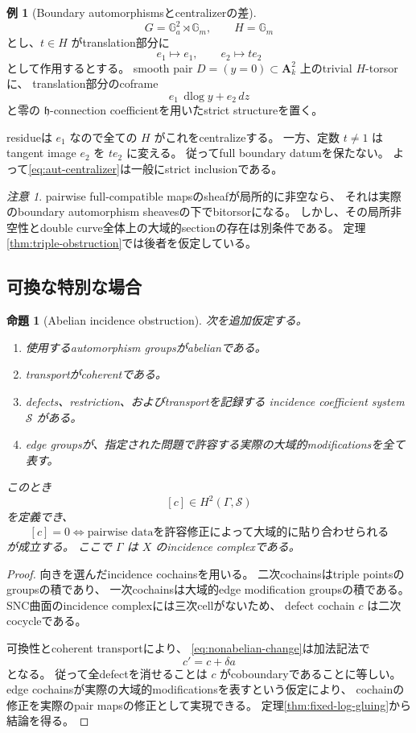 \documentclass[uplatex,dvipdfmx,11pt]{jsarticle}
\numberwithin{equation}{section}
\theoremstyle{plain}
\newtheorem{proposition}[theorem]{命題}
\theoremstyle{definition}
\newtheorem{example}[theorem]{例}
\theoremstyle{remark}
\newtheorem{remark}[theorem]{注意}
\DeclareMathOperator{\dlog}{dlog}
\newcommand{\GG}{\mathbb G}
\newcommand{\h}{\mathfrak h}
\begin{document}
\begin{example}[Boundary automorphismsとcentralizerの差]
\label{ex:centralizer}
\[
G=\GG_a^2\rtimes\GG_m,\qquad H=\GG_m
\]
とし、\(t\in H\) がtranslation部分に
\[
e_1\longmapsto e_1,\qquad e_2\longmapsto t e_2
\]
として作用するとする。
smooth pair \(D=(y=0)\subset\mathbf A_k^2\) 上のtrivial \(H\)-torsorに、
translation部分のcoframe
\[
e_1\,\dlog y+e_2\,dz
\]
と零の \(\h\)-connection coefficientを用いたstrict structureを置く。

residueは \(e_1\) なので全ての \(H\) がこれをcentralizeする。
一方、定数 \(t\ne1\) はtangent image \(e_2\) を \(t e_2\) に変える。
従ってfull boundary datumを保たない。
よって\eqref{eq:aut-centralizer}は一般にstrict inclusionである。
\end{example}

\begin{remark}
\label{rem:pairwise-local}
pairwise full-compatible mapsのsheafが局所的に非空なら、
それは実際のboundary automorphism sheavesの下でbitorsorになる。
しかし、その局所非空性とdouble curve全体上の大域的sectionの存在は別条件である。
定理\ref{thm:triple-obstruction}では後者を仮定している。
\end{remark}

\subsection{可換な特別な場合}

\begin{proposition}[Abelian incidence obstruction]
\label{prop:abelian}
次を追加仮定する。
\begin{enumerate}
\item 使用するautomorphism groupsがabelianである。
\item transportがcoherentである。
\item defects、restriction、およびtransportを記録する
incidence coefficient system \(\mathscr S\) がある。
\item edge groupsが、指定された問題で許容する実際の大域的modificationsを全て表す。
\end{enumerate}
このとき
\[
[c]\in H^2(\Gamma,\mathscr S)
\]
を定義でき、
\[
[c]=0
\iff
\text{pairwise dataを許容修正によって大域的に貼り合わせられる}
\]
が成立する。
ここで \(\Gamma\) は \(X\) のincidence complexである。
\end{proposition}

\begin{proof}
向きを選んだincidence cochainsを用いる。
二次cochainsはtriple pointsのgroupsの積であり、
一次cochainsは大域的edge modification groupsの積である。
SNC曲面のincidence complexには三次cellがないため、
defect cochain \(c\) は二次cocycleである。

可換性とcoherent transportにより、
\eqref{eq:nonabelian-change}は加法記法で
\[
c'=c+\delta a
\]
となる。
従って全defectを消せることは \(c\) がcoboundaryであることに等しい。
edge cochainsが実際の大域的modificationsを表すという仮定により、
cochainの修正を実際のpair mapsの修正として実現できる。
定理\ref{thm:fixed-log-gluing}から結論を得る。
\end{proof}
\end{document}

